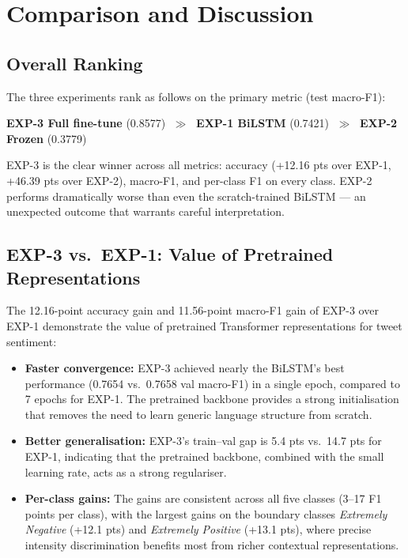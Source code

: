\section{Comparison and Discussion}

\subsection{Overall Ranking}

The three experiments rank as follows on the primary metric (test macro-F1):

\begin{center}
    \textbf{EXP-3 Full fine-tune} (0.8577) $\;\gg\;$ \textbf{EXP-1 BiLSTM} (0.7421) $\;\gg\;$ \textbf{EXP-2 Frozen} (0.3779)
\end{center}

EXP-3 is the clear winner across all metrics: accuracy (+12.16 pts over EXP-1, +46.39 pts over EXP-2), macro-F1, and per-class F1 on every class. EXP-2 performs dramatically worse than even the scratch-trained BiLSTM — an unexpected outcome that warrants careful interpretation.

\subsection{EXP-3 vs.\ EXP-1: Value of Pretrained Representations}

The 12.16-point accuracy gain and 11.56-point macro-F1 gain of EXP-3 over EXP-1 demonstrate the value of pretrained Transformer representations for tweet sentiment:

\begin{itemize}
    \item \textbf{Faster convergence:} EXP-3 achieved nearly the BiLSTM's best performance (0.7654 vs.\ 0.7658 val macro-F1) in a single epoch, compared to 7 epochs for EXP-1. The pretrained backbone provides a strong initialisation that removes the need to learn generic language structure from scratch.
    \item \textbf{Better generalisation:} EXP-3's train--val gap is 5.4 pts vs.\ 14.7 pts for EXP-1, indicating that the pretrained backbone, combined with the small learning rate, acts as a strong regulariser.
    \item \textbf{Per-class gains:} The gains are consistent across all five classes (3--17 F1 points per class), with the largest gains on the boundary classes \textit{Extremely Negative} (+12.1 pts) and \textit{Extremely Positive} (+13.1 pts), where precise intensity discrimination benefits most from richer contextual representations.
\end{itemize}

